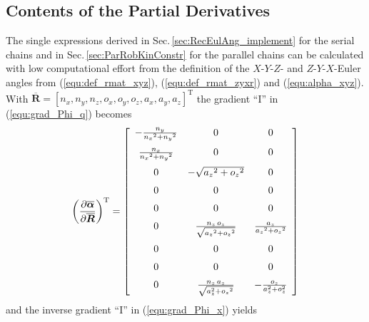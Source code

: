 \documentclass[robotics,article,submit,moreauthors,pdftex]{Definitions/mdpi}
\newcommand{\bm}[1]{\boldsymbol{#1}}
\newcommand{\transp}[0]{{\mathrm{T}}}
\begin{document}
\subsection{Contents of the Partial Derivatives}
\label{sec:appendix_content_derivatives}

The single expressions derived in Sec.\,\ref{sec:RecEulAng_implement} for the serial chains and in Sec.\,\ref{sec:ParRobKinConstr} for the parallel chains can be calculated with low computational effort from the definition of the $X$-$Y$-$Z$- and $Z$-$Y$-$X$-Euler angles from (\ref{equ:def_rmat_xyz}), (\ref{equ:def_rmat_zyxr}) and (\ref{equ:alpha_xyz}).
With $\overline{\bm{R}}=[n_x,n_y,n_z ,o_x,o_y,o_z,a_x,a_y,a_z]^\transp$ the gradient ``I'' in (\ref{equ:grad_Phi_q}) becomes
\begin{equation}
\left(\frac{\partial \overline{\bm{\alpha}}}{\partial \overline{\bm{R}}}\right)^\transp
=
\left[ \begin {array}{ccc} -{\frac {{n_y}}{{{n_x}}^{2}+{{n_y }}^{2}}}&0&0\\ \noalign{\medskip}{\frac {{n_x}}{{{n_x}}^{2}+{{ n_y}}^{2}}}&0&0\\ \noalign{\medskip}0&-\sqrt {{{a_z}}^{2}+{{ o_z}}^{2}}&0\\ \noalign{\medskip}0&0&0\\ \noalign{\medskip}0&0&0 \\ \noalign{\medskip}0&{\frac {{n_z}\,{o_z}}{\sqrt {{{a_z}}^{ 2}+{{o_z}}^{2}}}}&{\frac {{a_z}}{{{a_z}}^{2}+{{o_z}}^{2}}} \\ \noalign{\medskip}0&0&0\\ \noalign{\medskip}0&0&0 \\ \noalign{\medskip}0&{\frac {{n_z}\,{a_z}}{\sqrt {a_z^{2}+{{o_z}}^{2}}}}&-{\frac {o_z}{a_z^{2}+o_z^{2}} }\end {array} \right] 
\end{equation}
%
and the inverse gradient ``I'' in (\ref{equ:grad_Phi_x}) yields
%
\end{document}
